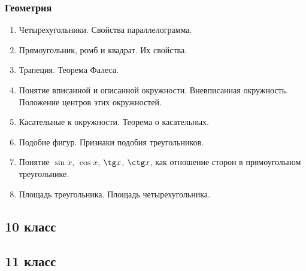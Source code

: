 \documentclass[12pt, a4paper]{article}
\begin{document}
			\subsubsection*{Геометрия}
			\begin{enumerate}[label=\textbf{\arabic*}.]
				\item Четырехугольники. Свойства параллелограмма.
				\item Прямоугольник, ромб и квадрат. Их свойства.
				\item Трапеция. Теорема Фалеса.
				\item Понятие вписанной и описанной окружности. Вневписанная окружность. Положение центров этих окружностей.
				\item Касательные к окружности. Теорема о касательных.
				\item Подобие фигур. Признаки подобия треугольников.
				\item Понятие \( \sin x \), \( \cos x \), \( \tg x \), \( \ctg x \), как отношение сторон в прямоугольном треугольнике.
				\item Площадь треугольника. Площадь четырехугольника.
			\end{enumerate}
		\subsection*{10 класс}
		\subsection*{11 класс}
\end{document}
